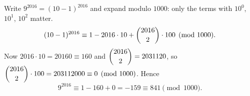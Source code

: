 Write $9^{2016}=(10-1)^{2016}$ and expand modulo $1000$: only the terms with $10^0$, $10^1$, $10^2$ matter.
\[(10-1)^{2016}\equiv1-2016\cdot10+\dbinom{2016}{2}\cdot100\pmod{1000}.\]
Now $2016\cdot10=20160\equiv160$ and $\dbinom{2016}2=2031120$, so $\dbinom{2016}{2}\cdot100=203112000\equiv0\pmod{1000}$. Hence
\[9^{2016}\equiv1-160+0=-159\equiv\boxed{841}\pmod{1000}.\]

